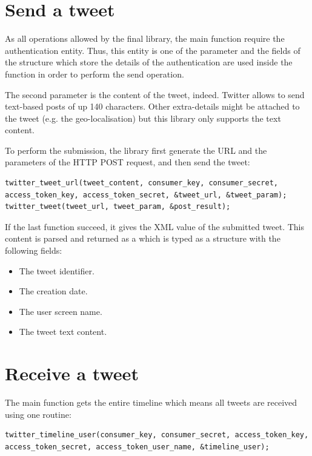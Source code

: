 \section{Send a tweet}

\hspace{15mm}As all operations allowed by the final library, the main function require the authentication entity. Thus, this entity is one of the parameter and the fields of the structure which store the details of the authentication are used inside the function in order to perform the send operation.

The second parameter is the content of the tweet, indeed. Twitter allows to send text-based posts of up 140 characters. Other extra-details might be attached to the tweet (e.g. the geo-localisation) but this library only supports the text content.

To perform the submission, the library first generate the URL and the parameters of the HTTP POST request, and then send the tweet:
\begin{lstlisting}
twitter_tweet_url(tweet_content, consumer_key, consumer_secret, access_token_key, access_token_secret, &tweet_url, &tweet_param);
twitter_tweet(tweet_url, tweet_param, &post_result);
\end{lstlisting}

If the last function succeed, it gives the XML value of the submitted tweet. This content is parsed and returned as a  which is typed as a structure with the following fields:
\begin{itemize}
\item The tweet identifier.
\item The creation date.
\item The user screen name.
\item The tweet text content.
\end{itemize}


\section{Receive a tweet}

\hspace{15mm}The main function gets the entire timeline which means all tweets are received using one routine:
\begin{lstlisting}
twitter_timeline_user(consumer_key, consumer_secret, access_token_key, access_token_secret, access_token_user_name, &timeline_user);
\end{lstlisting}

